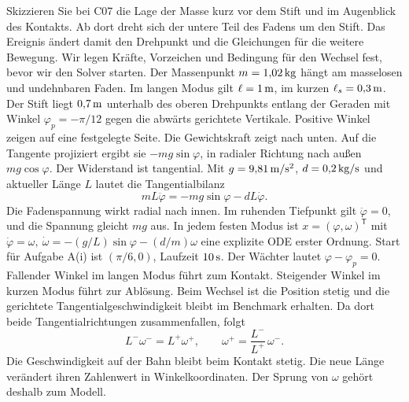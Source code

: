 Skizzieren Sie bei C07 die Lage der Masse kurz vor dem Stift und im Augenblick des Kontakts. Ab dort dreht sich der untere Teil des Fadens um den Stift. Das Ereignis ändert damit den Drehpunkt und die Gleichungen für die weitere Bewegung. Wir legen Kräfte, Vorzeichen und Bedingung für den Wechsel fest, bevor wir den Solver starten.
Der Massenpunkt \(m=1{,}02\,\mathrm{kg}\) hängt am masselosen und undehnbaren Faden. Im langen Modus gilt \(\ell=1\,\mathrm{m}\), im kurzen \(\ell_s=0{,}3\,\mathrm{m}\). Der Stift liegt \(0{,}7\,\mathrm{m}\) unterhalb des oberen Drehpunkts entlang der Geraden mit Winkel \(\varphi_p=-\pi/12\) gegen die abwärts gerichtete Vertikale. Positive Winkel zeigen auf eine festgelegte Seite. Die Gewichtskraft zeigt nach unten. Auf die Tangente projiziert ergibt sie \(-mg\sin\varphi\), in radialer Richtung nach außen \(mg\cos\varphi\). Der Widerstand ist tangential. Mit \(g=9{,}81\,\mathrm{m/s^2}\), \(d=0{,}2\,\mathrm{kg/s}\) und aktueller Länge \(L\) lautet die Tangentialbilanz
\[
 mL\ddot\varphi=-mg\sin\varphi-dL\dot\varphi .
\]
Die Fadenspannung wirkt radial nach innen. Im ruhenden Tiefpunkt gilt \(\ddot\varphi=0\), und die Spannung gleicht \(mg\) aus. In jedem festen Modus ist \(x=(\varphi,\omega)^\mathsf T\) mit \(\dot\varphi=\omega,\ \dot\omega=-(g/L)\sin\varphi-(d/m)\omega\) eine explizite ODE erster Ordnung. Start für Aufgabe A(i) ist \((\pi/6,0)\), Laufzeit \(10\,\mathrm{s}\).
Der Wächter lautet \(\varphi-\varphi_p=0\). Fallender Winkel im langen Modus führt zum Kontakt. Steigender Winkel im kurzen Modus führt zur Ablösung. Beim Wechsel ist die Position stetig und die gerichtete Tangentialgeschwindigkeit bleibt im Benchmark erhalten. Da dort beide Tangentialrichtungen zusammenfallen, folgt
\[
 L^- \omega^-=L^+\omega^+,\qquad
 \omega^+=\frac{L^-}{L^+}\,\omega^- .
\]
Die Geschwindigkeit auf der Bahn bleibt beim Kontakt stetig. Die neue Länge verändert ihren Zahlenwert in Winkelkoordinaten. Der Sprung von \(\omega\) gehört deshalb zum Modell.

